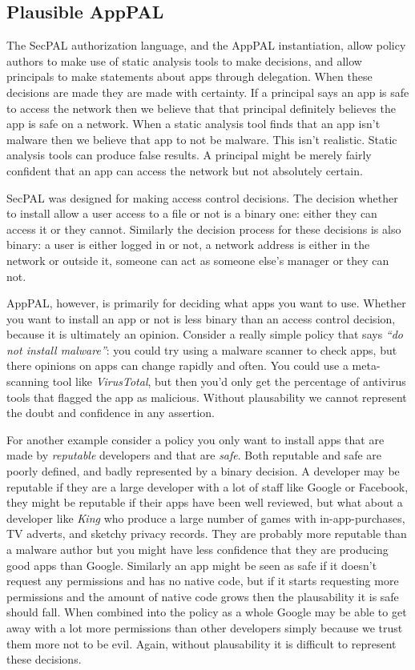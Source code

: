 \documentclass[a4paper]{scrartcl}
\begin{document}
\subsection{Plausible AppPAL}
\label{sec:plausible}

The SecPAL authorization language, and the AppPAL instantiation, allow policy
authors to make use of static analysis tools to make decisions, and allow
principals to make statements about apps through delegation. When these
decisions are made they are made with certainty. If a principal says an app is
safe to access the network then we believe that that principal definitely
believes the app is safe on a network. When a static analysis tool finds that an
app isn't malware then we believe that app to not be malware. This isn't
realistic. Static analysis tools can produce false results. A principal might be
merely fairly confident that an app can access the network but not absolutely
certain.

SecPAL was designed for making access control decisions. The decision whether to
install allow a user access to a file or not is a binary one: either they can
access it or they cannot. Similarly the decision process for these decisions is
also binary: a user is either logged in or not, a network address is either in
the network or outside it, someone can act as someone else's manager or they can
not.

AppPAL, however, is primarily for deciding what apps you want to use. Whether
you want to install an app or not is less binary than an access control
decision, because it is ultimately an opinion. Consider a really simple policy
that says \emph{``do not install malware''}: you could try using a malware
scanner to check apps, but there opinions on apps can change rapidly and often.
You could use a meta-scanning tool like \emph{VirusTotal}, but then you'd only
get the percentage of antivirus tools that flagged the app as malicious. Without
plausability we cannot represent the doubt and confidence in any assertion.

For another example consider a policy you only want to install apps that are
made by \emph{reputable} developers and that are \emph{safe}. Both reputable and
safe are poorly defined, and badly represented by a binary decision. A developer
may be reputable if they are a large developer with a lot of staff like Google
or Facebook, they might be reputable if their apps have been well reviewed, but
what about a developer like \emph{King} who produce a large number of games with
in-app-purchases, TV adverts, and sketchy privacy records. They are probably
more reputable than a malware author but you might have less confidence that
they are producing good apps than Google. Similarly an app might be seen as safe
if it doesn't request any permissions and has no native code, but if it starts
requesting more permissions and the amount of native code grows then the
plausability it is safe should fall. When combined into the policy as a whole
Google may be able to get away with a lot more permissions than other developers
simply because we trust them more not to be evil. Again, without plausability it
is difficult to represent these decisions.
\end{document}
